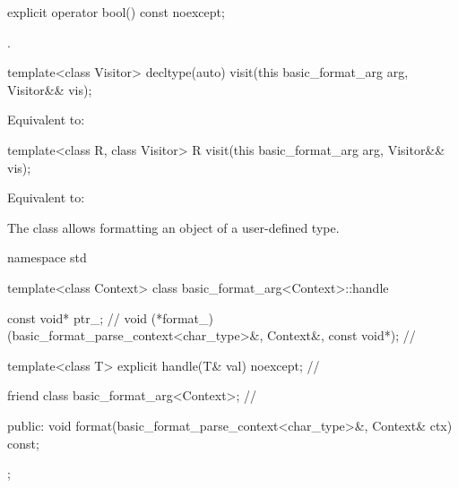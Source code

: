 %

%
\begin{itemdecl}
explicit operator bool() const noexcept;
\end{itemdecl}

\begin{itemdescr}
\pnum
\returns
{}.
\end{itemdescr}

%
\begin{itemdecl}
template<class Visitor>
  decltype(auto) visit(this basic_format_arg arg, Visitor&& vis);
\end{itemdecl}

\begin{itemdescr}
\pnum
\effects
Equivalent to: 
\end{itemdescr}

%
\begin{itemdecl}
template<class R, class Visitor>
  R visit(this basic_format_arg arg, Visitor&& vis);
\end{itemdecl}

\begin{itemdescr}
\pnum
\effects
Equivalent to: 
\end{itemdescr}

\pnum
The class  allows formatting an object of a user-defined type.

%
%
\begin{codeblock}
namespace std {
  template<class Context>
  class basic_format_arg<Context>::handle {
    const void* ptr_;                                           // \expos
    void (*format_)(basic_format_parse_context<char_type>&,
                    Context&, const void*);                     // \expos

    template<class T> explicit handle(T& val) noexcept;         // \expos

    friend class basic_format_arg<Context>;                     // \expos

  public:
    void format(basic_format_parse_context<char_type>&, Context& ctx) const;
  };
}
\end{codeblock}

